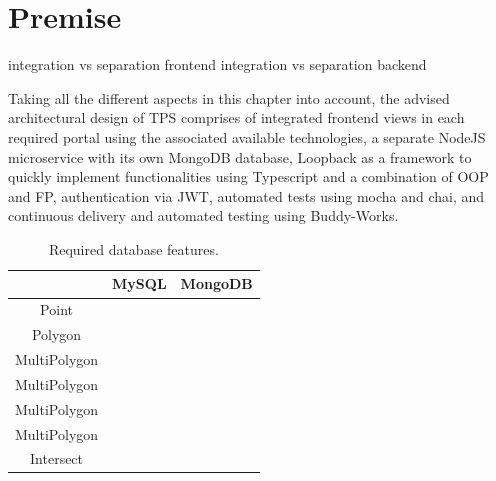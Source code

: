 \section{Premise}

integration vs separation frontend
integration vs separation backend




Taking all the different aspects in this chapter into account, the advised architectural design of TPS comprises of integrated frontend views in each required portal using the associated available technologies, a separate NodeJS microservice with its own MongoDB database, Loopback as a framework to quickly implement functionalities using Typescript and a combination of OOP and FP, authentication via JWT, automated tests using mocha and chai, and continuous delivery and automated testing using Buddy-Works.

\begin{table}[htbp!]
	\centering
	\begin{tabular}{c|c|c}
		\toprule
		& MySQL & MongoDB \\
		\midrule
		Point & \checkmark & \checkmark \\
		Polygon & \checkmark & \checkmark \\
		MultiPolygon & \checkmark & \checkmark \\
		MultiPolygon & \checkmark & \checkmark \\
		MultiPolygon & \checkmark & \checkmark \\
		MultiPolygon & \checkmark & \checkmark \\
		Intersect & \checkmark & \checkmark \\
		\bottomrule
	\end{tabular}
	\caption[Databases]{Required database features.}
	\label{tab:databases}
\end{table}